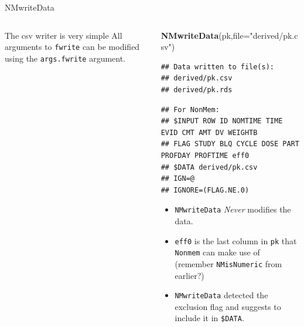 \documentclass[
  8pt,
  ignorenonframetext,
  aspectratio=169]{beamer}
\newenvironment{Shaded}{\begin{snugshade}}{\end{snugshade}}
\newcommand{\DataTypeTok}[1]{\textcolor[rgb]{0.13,0.29,0.53}{#1}}
\newcommand{\KeywordTok}[1]{\textcolor[rgb]{0.13,0.29,0.53}{\textbf{#1}}}
\newcommand{\NormalTok}[1]{#1}
\newcommand{\StringTok}[1]{\textcolor[rgb]{0.31,0.60,0.02}{#1}}
\begin{document}
\begin{frame}[fragile]{NMwriteData}
\begin{columns}[T]
\begin{column}{0.48\textwidth}
\begin{block}{The csv writer is very simple}
All arguments to \texttt{fwrite} can be modified using the
\texttt{args.fwrite} argument.
\end{block}
\end{column}

\begin{column}{0.48\textwidth}
\footnotesize

\begin{Shaded}
\begin{Highlighting}[]
\KeywordTok{NMwriteData}\NormalTok{(pk,}\DataTypeTok{file=}\StringTok{"derived/pk.csv"}\NormalTok{)}
\end{Highlighting}
\end{Shaded}

\begin{verbatim}
## Data written to file(s):
## derived/pk.csv
## derived/pk.rds
\end{verbatim}

\begin{verbatim}
## For NonMem:
## $INPUT ROW ID NOMTIME TIME EVID CMT AMT DV WEIGHTB
## FLAG STUDY BLQ CYCLE DOSE PART PROFDAY PROFTIME eff0
## $DATA derived/pk.csv
## IGN=@
## IGNORE=(FLAG.NE.0)
\end{verbatim}

\normalsize

\vspace{12pt}

\begin{itemize}
\item
  \texttt{NMwriteData} \emph{Never} modifies the data.
\item
  \texttt{eff0} is the last column in \texttt{pk} that \texttt{Nonmem}
  can make use of (remember \texttt{NMisNumeric} from earlier?)
\item
  \texttt{NMwriteData} detected the exclusion flag and suggests to
  include it in \texttt{\$DATA}.
\end{itemize}
\end{column}
\end{columns}
\end{frame}
\end{document}
